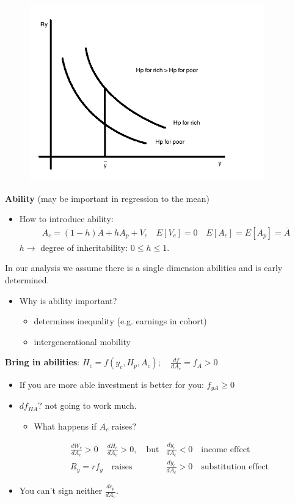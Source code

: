 \documentclass[14pt,notitlepage]{article}
\begin{document}
\begin{center}
\begin{figure}[H] 
\caption{}
\centering
\includegraphics[width=4in, height=3in]{plot6.png}
\end{figure}
\end{center}


\textbf{Ability} (may be important in regression to the mean)

\begin{itemize}
\item How to introduce ability:
\begin{align*}
A_c = (1-h) \overline{A} + h A_p + V_c \quad E[V_c] = 0 \quad E[A_c] = E[A_p] = \overline{A}
\end{align*}
$h \rightarrow$ degree of inheritability: \quad $0 \leq h \leq 1$.
\end{itemize}


In our analysis we assume there is a single dimension abilities and is early determined.
\begin{itemize}
\item Why is ability important?
    \begin{itemize}
    \item determines inequality (e.g. earnings in cohort)
    \item intergenerational mobility
    \end{itemize}
\end{itemize}

\textbf{Bring in abilities}: \quad $H_c = f(y_c, H_p, A_c); \quad \frac{df}{dA_c} = f_A > 0$
\begin{itemize}
\item If you are more able investment is better for you: $f_{yA} \geq 0$
\item $df_{HA}?$ not going to work much.
    \begin{itemize}
    \item What happens if $A_c$ raises?
    \end{itemize}
\begin{align*}
&\frac{dW_c}{dA_c} > 0 \quad \frac{dH_c}{dA_c} > 0, \quad \text{but} &\frac{dy_c}{dA_c} < 0 \quad \text{income effect} \\
&R_y = r f_y \quad \text{raises} &\frac{dy_c}{dA_c} > 0 \quad \text{substitution effect}
\end{align*}
\item You can't sign neither $\frac{dc_p}{dA_c}$.
\end{itemize}
\end{document}
